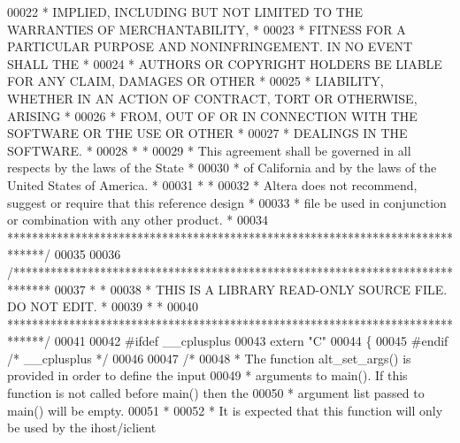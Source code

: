 \begin{DoxyCode}
00022 \textcolor{comment}{* IMPLIED, INCLUDING BUT NOT LIMITED TO THE WARRANTIES OF MERCHANTABILITY,    *}
00023 \textcolor{comment}{* FITNESS FOR A PARTICULAR PURPOSE AND NONINFRINGEMENT. IN NO EVENT SHALL THE *}
00024 \textcolor{comment}{* AUTHORS OR COPYRIGHT HOLDERS BE LIABLE FOR ANY CLAIM, DAMAGES OR OTHER      *}
00025 \textcolor{comment}{* LIABILITY, WHETHER IN AN ACTION OF CONTRACT, TORT OR OTHERWISE, ARISING     *}
00026 \textcolor{comment}{* FROM, OUT OF OR IN CONNECTION WITH THE SOFTWARE OR THE USE OR OTHER         *}
00027 \textcolor{comment}{* DEALINGS IN THE SOFTWARE.                                                   *}
00028 \textcolor{comment}{*                                                                             *}
00029 \textcolor{comment}{* This agreement shall be governed in all respects by the laws of the State   *}
00030 \textcolor{comment}{* of California and by the laws of the United States of America.              *}
00031 \textcolor{comment}{*                                                                             *}
00032 \textcolor{comment}{* Altera does not recommend, suggest or require that this reference design    *}
00033 \textcolor{comment}{* file be used in conjunction or combination with any other product.          *}
00034 \textcolor{comment}{******************************************************************************/}
00035 
00036 \textcolor{comment}{/******************************************************************************}
00037 \textcolor{comment}{*                                                                             *}
00038 \textcolor{comment}{* THIS IS A LIBRARY READ-ONLY SOURCE FILE. DO NOT EDIT.                       *}
00039 \textcolor{comment}{*                                                                             *}
00040 \textcolor{comment}{******************************************************************************/}
00041 
00042 \textcolor{preprocessor}{#ifdef \_\_cplusplus}
00043 \textcolor{keyword}{extern} \textcolor{stringliteral}{"C"}
00044 \{
00045 \textcolor{preprocessor}{#endif }\textcolor{comment}{/* \_\_cplusplus */}\textcolor{preprocessor}{}
00046 
00047 \textcolor{comment}{/*}
00048 \textcolor{comment}{ * The function alt\_set\_args() is provided in order to define the input }
00049 \textcolor{comment}{ * arguments to main(). If this function is not called before main() then the}
00050 \textcolor{comment}{ * argument list passed to main() will be empty.}
00051 \textcolor{comment}{ *}
00052 \textcolor{comment}{ * It is expected that this function will only be used by the ihost/iclient}

\end{DoxyCode}
